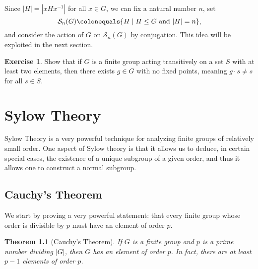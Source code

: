 \documentclass[12pt]{report}
\newtheorem{theorem}{Theorem}[chapter]
\numberwithin{equation}{section}
\numberwithin{theorem}{chapter}
\theoremstyle{definition}
\newtheorem{exercise}{Exercise}
\newtheorem*{basic properties}{Basic Properties}
\newtheorem*{Important Remark}{Important Remark}
\begin{document}
Since $|H| = |xHx^{-1}|$ for all $x \in G$, we can fix a natural number $n$, set
$$\mathcal{S}_n(G) \colonequals \{H \mid H \leq G  \text{ and } |H| = n\},$$ 
and consider the action of $G$ on $\mathcal{S}_n(G)$ by conjugation.
This idea will be exploited in the next section. 



\begin{exercise}
	Show that if $G$ is a finite group acting transitively on a set $S$ with at least two elements, then there exists $g \in G$ with no fixed points, meaning $g \cdot s \neq s$ for all $s \in S$.
\end{exercise}





\chapter{Sylow Theory}


Sylow Theory is a very powerful technique for analyzing finite groups of relatively small order. One aspect of Sylow theory is that it allows us to deduce, in certain special cases, the existence of a unique subgroup of a given order, and thus it allows one to construct a normal subgroup. 





\section{Cauchy's Theorem}

We start by proving a very powerful statement: that every finite group whose order is divisible by $p$ must have an element of order $p$.

\begin{theorem}[Cauchy's Theorem]\label{Cauchy's Theorem}\label{Cauchy's Theorem}
 If $G$ is a finite group and $p$ is a prime number dividing $|G|$, then $G$ has an element of order $p$. In fact, there are at least $p-1$ elements of order $p$.
 \end{theorem}
\end{document}
